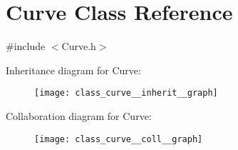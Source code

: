 \hypertarget{class_curve}{}\section{Curve Class Reference}
\label{class_curve}


{\ttfamily \#include $<$Curve.\+h$>$}



Inheritance diagram for Curve\+:
\nopagebreak
\begin{figure}[H]
\begin{center}
\leavevmode
\texttt{[image: class\_curve\_\_inherit\_\_graph]}
\end{center}
\end{figure}


Collaboration diagram for Curve\+:\nopagebreak
\begin{figure}[H]
\begin{center}
\leavevmode
\texttt{[image: class\_curve\_\_coll\_\_graph]}
\end{center}
\end{figure}
